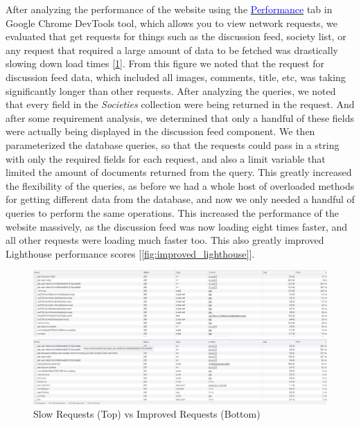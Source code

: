 After analyzing the performance of the website using the \href{https://developer.chrome.com/docs/devtools/evaluate-performance/}{\textcolor{blue}{Performance}} tab in Google Chrome DevTools tool, which allows you to view network requests, we evaluated that get requests for things such as the discussion feed, society list, or any request that required a large amount of data to be fetched was drastically slowing down load times [\ref{fig:slow_network}]. From this figure we noted that the request for discussion feed data, which included all images, comments, title, etc, was taking significantly longer than other requests. After analyzing the queries, we noted that every field in the \textit{Societies} collection were being returned in the request. And after some requirement analysis, we determined that only a handful of these fields were actually being displayed in the discussion feed component. We then parameterized the database queries, so that the requests could pass in a string with only the required fields for each request, and also a limit variable that limited the amount of documents returned from the query. This greatly increased the flexibility of the queries, as before we had a whole host of overloaded methods for getting different data from the database, and now we only needed a handful of queries to perform the same operations. This increased the performance of the website massively, as the discussion feed was now loading eight times faster, and all other requests were loading much faster too. This also greatly improved Lighthouse performance scores [\ref{fig:improved_lighthouse}].

\begin{figure}[H]
  \centering
  \includegraphics[scale=0.4]{img/slow_network_times.jpg}
  
  \newline
  
  \includegraphics[scale=0.4]{img/improved_network_times.jpg}
  \caption{Slow Requests (Top) vs Improved Requests (Bottom)}
  \label{fig:slow_network}
\end{figure}


